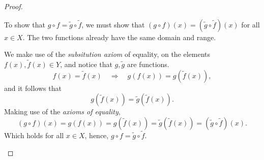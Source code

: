 \begin{exercise}[3.3.1]
\begin{proof}
\begin{itemize}
              To show that $g\circ f = \tilde{g}\circ \tilde{f}$, we must show
              that $(g\circ f)(x)=(\tilde{g}\circ \tilde{f})(x)$ for all $x\in
              X$. The two functions already have the same domain and range.

              We make use of the \emph{subsitution axiom} of equality, on the
              elements $f(x),\tilde{f}(x)\in Y$, and notice that $g,\tilde{g}$
              are functions.
              \begin{equation*}
                  f(x)=\tilde{f}(x) \quad \Longrightarrow \quad g(f(x))=g(\tilde{f}(x)),
              \end{equation*}
              and it follows that 
              \begin{equation*}
                  g(\tilde{f}(x))=\tilde{g}(\tilde{f}(x)).
              \end{equation*}
              Making use of the \emph{axioms of equality}, 
              \begin{equation*}
                  (g\circ f)(x)=g(f(x))=g(\tilde{f}(x))=\tilde{g}(\tilde{f}(x))=(\tilde{g}\circ \tilde{f})(x).
              \end{equation*}
              Which holds for all $x\in X$, hence, $g\circ f = \tilde{g}\circ \tilde{f}$.
          \end{itemize}
     \end{proof}
\end{exercise}
